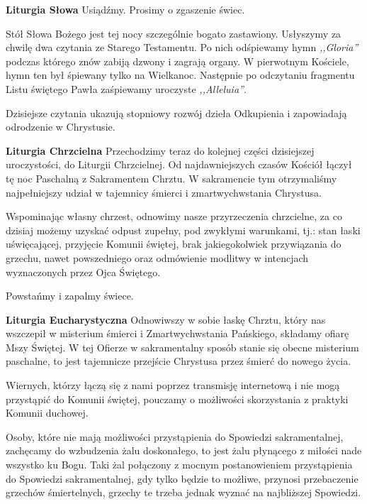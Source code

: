 \documentclass[10pt,oneside,final,notitlepage,a4paper,wide]{mwart}
\begin{document}
	\textbf{Liturgia Słowa} Usiądźmy. Prosimy o zgaszenie świec.
\par Stół Słowa Bożego jest tej nocy szczególnie bogato zastawiony. Usłyszymy za chwilę dwa czytania ze Starego Testamentu. Po nich odśpiewamy hymn \emph{,,Gloria''} podczas którego znów zabiją dzwony i zagrają organy. W pierwotnym Kościele, hymn ten był śpiewany tylko na Wielkanoc. Następnie po odczytaniu fragmentu Listu świętego Pawła zaśpiewamy uroczyste \emph{,,Alleluia''}.
\par Dzisiejsze czytania ukazują stopniowy rozwój dzieła Odkupienia i zapowiadają odrodzenie w Chrystusie. \newpage %

	\textbf{Liturgia Chrzcielna} Przechodzimy teraz do kolejnej części dzisiejszej uroczystości, do Liturgii Chrzcielnej. Od najdawniejszych czasów Kościół łączył tę noc Paschalną z Sakramentem Chrztu. W sakramencie tym otrzymaliśmy najpełniejszy udział w tajemnicy śmierci i zmartwychwstania Chrystusa.
\par Wspominając własny chrzest, odnowimy nasze przyrzeczenia chrzcielne, za co dzisiaj możemy uzyskać odpust zupełny, pod zwykłymi warunkami, tj.: stan łaski uświęcającej, przyjęcie Komunii świętej, brak jakiegokolwiek przywiązania do grzechu, nawet powszedniego oraz odmówienie modlitwy w intencjach wyznaczonych przez Ojca Świętego.
\par Powstańmy i zapalmy świece. \bigskip

	\textbf{Liturgia Eucharystyczna} Odnowiwszy w sobie łaskę Chrztu, który nas wszczepił w misterium śmierci i Zmartwychwstania Pańskiego, składamy ofiarę Mszy Świętej. W tej Ofierze w sakramentalny sposób stanie się obecne misterium paschalne, to jest tajemnicze przejście Chrystusa przez śmierć do nowego życia. \bigskip
	
	Wiernych, którzy łączą się z nami poprzez transmisję internetową i nie mogą przystąpić do Komunii świętej, pouczamy o możliwości skorzystania z praktyki Komunii duchowej.
\par Osoby, które nie mają możliwości przystąpienia do Spowiedzi sakramentalnej, zachęcamy do wzbudzenia żalu doskonałego, to jest żalu płynącego z miłości nade wszystko ku Bogu. Taki żal połączony z mocnym postanowieniem przystąpienia do Spowiedzi sakramentalnej, gdy tylko będzie to możliwe, przynosi przebaczenie grzechów śmiertelnych, grzechy te trzeba jednak wyznać na najbliższej Spowiedzi.
\end{document}
